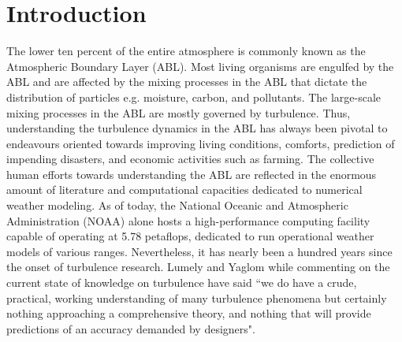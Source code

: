 \chapter{Introduction}\label{chap:intro_chap}
The lower ten percent of the entire atmosphere is commonly known as the Atmospheric Boundary Layer (ABL). Most living organisms are engulfed by the ABL and are affected by the mixing processes in the ABL that dictate the distribution of particles e.g. moisture, carbon, and pollutants. The large-scale mixing processes in the ABL are mostly governed by turbulence. Thus, understanding the turbulence dynamics in the ABL has always been pivotal to endeavours oriented towards improving living conditions, comforts, prediction of impending disasters, and economic activities such as farming. The collective human efforts towards understanding the ABL are reflected in the enormous amount of literature and computational capacities dedicated to numerical weather modeling. As of today, the National Oceanic and Atmospheric Administration (NOAA) alone hosts a high-performance computing facility capable of operating at 5.78 petaflops, dedicated to run operational weather models of various ranges. Nevertheless, it has nearly been a hundred years since the onset of turbulence research. Lumely and Yaglom \cite{lumely_yaglom_FTC_2001}  while commenting on the current state of knowledge on turbulence have said ``we do have a crude, practical, working understanding of many turbulence phenomena but certainly nothing approaching a comprehensive theory, and nothing that will provide predictions of an accuracy demanded by designers". 


